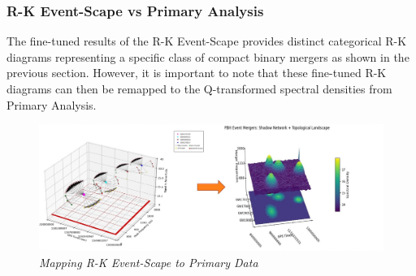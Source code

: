 


 \subsubsection{R-K Event-Scape vs Primary Analysis}
 
 The fine-tuned results of the R-K Event-Scape provides distinct categorical R-K diagrams representing a specific class of compact binary mergers as shown in the previous section. However, it is important to note that these fine-tuned R-K diagrams can then be remapped to the Q-transformed spectral densities from Primary Analysis.  
 
 \begin{figure}[H]
 	\centering
 	\includegraphics[width=1.0\linewidth]{images/76_Mapping R_K eventScape to Primary Data.jpg}
	\caption{\textit{Mapping R-K Event-Scape to Primary Data}}
 	\label{fig:LIGO17_PlaceHolder_fig}
 \end{figure}


